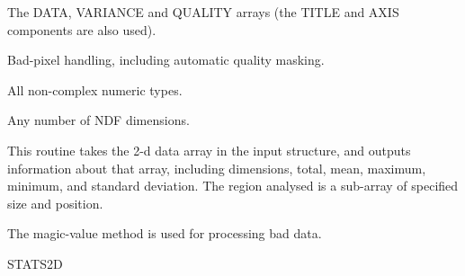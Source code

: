 {{{{         \sstitem
         The DATA, VARIANCE and QUALITY arrays (the TITLE and AXIS
         components are also used).

         \sstitem
         Bad-pixel handling, including automatic quality masking.

         \sstitem
         All non-complex numeric types.

         \sstitem
         Any number of NDF dimensions.
      }
   }
}

\begin{manroutinedescription}
  This routine takes the 2-d data array in the input {}
  structure, and outputs information about that array, including
  dimensions, total, mean, maximum, minimum, and standard
  deviation. The region analysed is a sub-array of specified size
  and position.

  The magic-value method is used for processing bad data.

  STATS2D


\end{manroutinedescription}}
